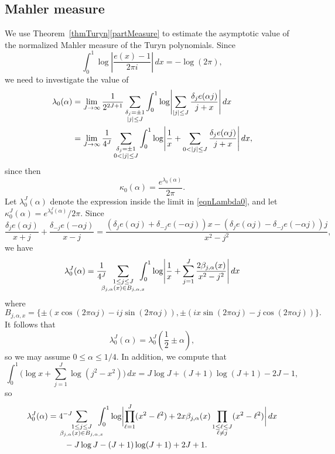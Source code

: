 \documentclass[reqno]{amsart}
\numberwithin{equation}{section}
\numberwithin{table}{section}
\numberwithin{figure}{section}
\newcommand{\abs}[1]{\left\lvert#1\right\rvert}
\begin{document}
\subsection{Mahler measure}\label{subsecMahlerMeas}
We use Theorem~\ref{thmTuryn}\ref{partMeasure} to estimate the asymptotic value of the normalized Mahler measure of the Turyn polynomials.
Since
\[
\int_0^1 \log\abs{\frac{e(x)-1}{2\pi i}}\,dx
= -\log(2\pi),
\]
we need to investigate the value of
\begin{align}\label{eqnLambda0}
\lambda_0(\alpha)
&= \lim_{J\to\infty} \frac{1}{2^{2J+1}} \sum_{\substack{\delta_j=\pm1\\\abs{j}\leq J}} \int_0^1 \log \Biggl\lvert \sum_{\abs{j}\leq J} \frac{\delta_j e(\alpha j)}{j+x} \Biggr\rvert \, dx\notag\\
&= \lim_{J\to\infty} \frac{1}{4^J} \sum_{\substack{\delta_j=\pm1\\0<\abs{j}\leq J}} \int_0^1 \log \Biggl\lvert \frac{1}{x} + \sum_{0<\abs{j}\leq J} \frac{\delta_j e(\alpha j)}{j+x} \Biggr\rvert \, dx,
\end{align}
since then
\[
\kappa_0(\alpha) = \frac{e^{\lambda_0(\alpha)}}{2\pi}.
\]
Let $\lambda_0^J(\alpha)$ denote the expression inside the limit in \eqref{eqnLambda0}, and let $\kappa_0^J(\alpha) = e^{\lambda_0^J(\alpha)}/2\pi$.
Since
\[
\frac{\delta_j e(\alpha j)}{x+j} + \frac{\delta_{-j} e(-\alpha j)}{x-j} = \frac{(\delta_je(\alpha j)+\delta_{-j}e(-\alpha j))x-(\delta_je(\alpha j)-\delta_{-j}e(-\alpha j))j}{x^2-j^2},
\]
we have
\[
\lambda_0^J(\alpha) = \frac{1}{4^J} \hspace{-2ex} \sum_{\substack{1\leq j\leq J\\\beta_{j,\alpha}(x)\in B_{j,\alpha,x}}} \hspace{-2ex} \int_0^1 \log \Biggl\lvert \frac{1}{x} + \sum_{j=1}^J \frac{2\beta_{j,\alpha}(x)}{x^2-j^2} \Biggr\rvert \, dx
\]
where
\[
B_{j,\alpha,x} = \{\pm(x\cos(2\pi \alpha j) - i j\sin(2\pi \alpha j)), \pm(i x\sin(2\pi \alpha j) - j\cos(2\pi \alpha j))\}.
\]
It follows that
\[
\lambda_0^J(\alpha) = \lambda_0^J\left(\frac{1}{2}\pm \alpha\right),
\]
so we may assume $0\leq \alpha \leq 1/4$.
In addition, we compute that
\[
\int_0^1 \biggl(\log x + \sum_{j=1}^J \log (j^2-x^2)\biggr) \, dx = J\log J + (J+1)\log(J+1) - 2J - 1,
\]
so
\begin{equation}\label{eqnTurynComputeAlpha}
\begin{split}
\lambda_0^J(\alpha)
&= 4^{-J} \hspace{-4ex} \sum_{\substack{1\leq j\leq J\\\beta_{j,\alpha}(x)\in B_{j,\alpha,x}}} \hspace{-2ex} \int_0^1 \log \biggl\lvert \prod_{\ell=1}^J (x^2-\ell^2) + 2x\beta_{j,\alpha}(x)\prod_{\substack{1\leq \ell\leq J\\\ell\neq j}} (x^2-\ell^2) \biggr\rvert \, dx\\
&\qquad - J\log J - (J+1)\log(J+1) + 2J + 1.
\end{split}
\end{equation}
\end{document}
